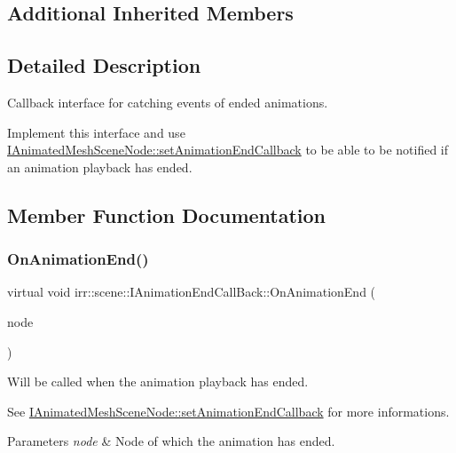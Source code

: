 \subsection*{Additional Inherited Members}


\subsection{Detailed Description}
Callback interface for catching events of ended animations. 

Implement this interface and use \hyperlink{classirr_1_1scene_1_1IAnimatedMeshSceneNode_ad688bb5a7654116d1ee823e48393f1bd}{I\+Animated\+Mesh\+Scene\+Node\+::set\+Animation\+End\+Callback} to be able to be notified if an animation playback has ended. 

\subsection{Member Function Documentation}
\mbox{\label{classirr_1_1scene_1_1IAnimationEndCallBack_a7676b37828697b63e42ad5264274cc1f}} 
\subsubsection{\texorpdfstring{On\+Animation\+End()}{OnAnimationEnd()}\hspace{0.1cm}{\footnotesize\ttfamily [1/2]}}
{\footnotesize\ttfamily virtual void irr\+::scene\+::\+I\+Animation\+End\+Call\+Back\+::\+On\+Animation\+End (\begin{DoxyParamCaption}\item[{\hyperlink{classirr_1_1scene_1_1IAnimatedMeshSceneNode}{I\+Animated\+Mesh\+Scene\+Node} $\ast$}]{node }\end{DoxyParamCaption})\hspace{0.3cm}{\ttfamily [pure virtual]}}



Will be called when the animation playback has ended. 

See \hyperlink{classirr_1_1scene_1_1IAnimatedMeshSceneNode_ad688bb5a7654116d1ee823e48393f1bd}{I\+Animated\+Mesh\+Scene\+Node\+::set\+Animation\+End\+Callback} for more informations. 
\begin{DoxyParams}{Parameters}
{\em node} & Node of which the animation has ended. \\
\hline
\end{DoxyParams}
\mbox{\label{classirr_1_1scene_1_1IAnimationEndCallBack_a7676b37828697b63e42ad5264274cc1f}} 
